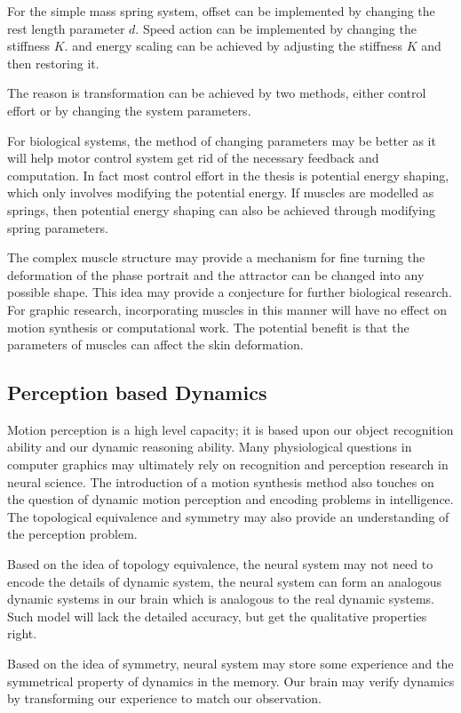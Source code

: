 For the simple  mass spring system,
offset can be implemented by changing the rest length parameter $d$.
Speed action can be implemented by changing the stiffness $K$.
and energy scaling can be achieved by adjusting the stiffness $K$ and then restoring it.
 

The reason is transformation can be achieved by two methods, either control effort or by changing the system parameters.

For biological systems, the method of changing parameters  may be better as it will help motor control system get rid of the necessary feedback and computation. 
In fact most control effort in the thesis is potential energy shaping, which only involves  modifying the potential energy.
If muscles are modelled as springs, then potential energy shaping can also be achieved through modifying spring parameters.

The complex muscle structure may provide a mechanism for fine turning the deformation of the phase portrait and  the attractor can be changed into any possible shape.
This idea may provide a conjecture for further biological research.
For graphic research, incorporating muscles in this manner will have no effect on motion synthesis or computational work.
The potential benefit is that the parameters of muscles can affect the skin deformation.



\subsection{Perception based Dynamics}
Motion perception is a high level capacity; it is based upon our object recognition ability and our dynamic reasoning ability.
Many physiological questions in computer graphics may ultimately rely on recognition and perception research in neural science.
The introduction of a motion synthesis method also touches on  the question of dynamic motion perception and encoding problems in intelligence.
The topological equivalence and symmetry may also provide an understanding of the perception problem.

Based on the idea of topology equivalence, the neural system may not need to encode the details of dynamic system, the neural system can form an analogous dynamic systems in our brain which is analogous to the real dynamic systems.
Such model will lack the detailed accuracy, but get the qualitative properties right.

Based on the idea of symmetry, neural system may store some experience and the symmetrical property of dynamics in the memory.
Our brain may verify dynamics by transforming our experience to match our observation.



